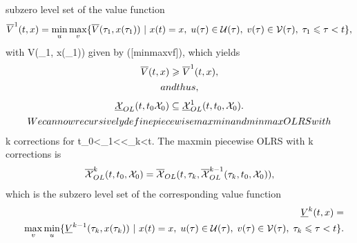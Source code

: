 \documentclass[letterpaper,10pt,english]{sphinxmanual}
\begin{document}
subzero level set of the value function
\begin{gather}
\begin{split}\overline{V}^1(t, x) =
\min_u\max_v\{\overline{V}(\tau_1, x(\tau_1)) ~|~ x(t)=x, \;
u(\tau)\in{\mathcal U}(\tau), \; v(\tau)\in{\mathcal V}(\tau), \; \tau_1\leqslant\tau<t\},
\label{minmaxvf1}\end{split}\notag
\end{gather}
with V(\tau_1, x(\tau_1)) given by ({[}minmaxvf{]}), which yields
\begin{gather}
\begin{split}\overline{V}(t, x) \geqslant\overline{V}^1(t, x),\end{split}\notag\\\begin{split}and thus,\end{split}\notag
\end{gather}\begin{gather}
\begin{split}\underline{{\mathcal X}}_{OL}(t, t_0 {\mathcal X}_0) \subseteq \underline{{\mathcal X}}_{OL}^1(t, t_0, {\mathcal X}_0) .\end{split}\notag\\\begin{split}We can now recursively define piecewise maxmin and minmax OLRS with\end{split}\notag
\end{gather}
k corrections for t_0<\tau_1<\cdots<\tau_k<t. The maxmin
piecewise OLRS with k corrections is
\begin{gather}
\begin{split}\overline{{\mathcal X}}_{OL}^k(t, t_0, {\mathcal X}_0) =
\overline{{\mathcal X}}_{OL}(t, \tau_k, \overline{{\mathcal X}}_{OL}^{k-1}(\tau_k, t_0, {\mathcal X}_0)),
\label{maxmink}\end{split}\notag
\end{gather}
which is the subzero level set of the corresponding value function
\begin{gather}
\begin{split}\begin{aligned}
&&\underline{V}^k(t, x) = \nonumber \\
&&\max_v\min_u\{\underline{V}^{k-1}(\tau_k, x(\tau_k)) ~|~ x(t)=x, \;
u(\tau)\in{\mathcal U}(\tau), \; v(\tau)\in{\mathcal V}(\tau), \; \tau_k\leqslant\tau<t\}.
\label{maxminvfk}\end{aligned}\end{split}\notag
\end{gather}
\end{document}
